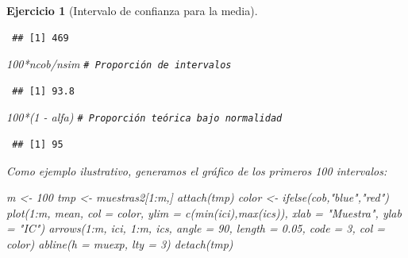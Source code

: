 \documentclass[
  10pt,
]{book}
\newenvironment{Shaded}{\begin{snugshade}}{\end{snugshade}}
\newcommand{\AttributeTok}[1]{\textcolor[rgb]{0.77,0.63,0.00}{#1}}
\newcommand{\CommentTok}[1]{\textcolor[rgb]{0.56,0.35,0.01}{\textit{#1}}}
\newcommand{\DecValTok}[1]{\textcolor[rgb]{0.00,0.00,0.81}{#1}}
\newcommand{\FloatTok}[1]{\textcolor[rgb]{0.00,0.00,0.81}{#1}}
\newcommand{\FunctionTok}[1]{\textcolor[rgb]{0.00,0.00,0.00}{#1}}
\newcommand{\NormalTok}[1]{#1}
\newcommand{\OtherTok}[1]{\textcolor[rgb]{0.56,0.35,0.01}{#1}}
\newcommand{\SpecialCharTok}[1]{\textcolor[rgb]{0.00,0.00,0.00}{#1}}
\newcommand{\StringTok}[1]{\textcolor[rgb]{0.31,0.60,0.02}{#1}}
\theoremstyle{break}
\newtheorem{exercise}{Ejercicio}[chapter]
\theoremstyle{nonumberplain}
\renewcommand{\CommentTok}[1]{\textcolor[rgb]{0.41,0.41,0.41}{\texttt{#1}}}
\begin{document}
\begin{exercise}[Intervalo de confianza para la media]
\begin{enumerate}
\begin{verbatim}
 ## [1] 469
\end{verbatim}

\begin{Shaded}
\begin{Highlighting}[]
\DecValTok{100}\SpecialCharTok{*}\NormalTok{ncob}\SpecialCharTok{/}\NormalTok{nsim     }\CommentTok{\# Proporción de intervalos}
\end{Highlighting}
\end{Shaded}

\begin{verbatim}
 ## [1] 93.8
\end{verbatim}

\begin{Shaded}
\begin{Highlighting}[]
\DecValTok{100}\SpecialCharTok{*}\NormalTok{(}\DecValTok{1} \SpecialCharTok{{-}}\NormalTok{ alfa)    }\CommentTok{\# Proporción teórica bajo normalidad}
\end{Highlighting}
\end{Shaded}

\begin{verbatim}
 ## [1] 95
\end{verbatim}

  Como ejemplo ilustrativo, generamos el gráfico de los primeros 100 intervalos:

\begin{Shaded}
\begin{Highlighting}[]
\NormalTok{m }\OtherTok{\textless{}{-}} \DecValTok{100}
\NormalTok{tmp }\OtherTok{\textless{}{-}}\NormalTok{ muestras2[}\DecValTok{1}\SpecialCharTok{:}\NormalTok{m,]}
\FunctionTok{attach}\NormalTok{(tmp)}
\NormalTok{color }\OtherTok{\textless{}{-}} \FunctionTok{ifelse}\NormalTok{(cob,}\StringTok{"blue"}\NormalTok{,}\StringTok{"red"}\NormalTok{)}
\FunctionTok{plot}\NormalTok{(}\DecValTok{1}\SpecialCharTok{:}\NormalTok{m, mean, }\AttributeTok{col =}\NormalTok{ color, }\AttributeTok{ylim =} \FunctionTok{c}\NormalTok{(}\FunctionTok{min}\NormalTok{(ici),}\FunctionTok{max}\NormalTok{(ics)), }
     \AttributeTok{xlab =} \StringTok{"Muestra"}\NormalTok{, }\AttributeTok{ylab =} \StringTok{"IC"}\NormalTok{)}
\FunctionTok{arrows}\NormalTok{(}\DecValTok{1}\SpecialCharTok{:}\NormalTok{m, ici, }\DecValTok{1}\SpecialCharTok{:}\NormalTok{m, ics, }\AttributeTok{angle =} \DecValTok{90}\NormalTok{, }\AttributeTok{length =} \FloatTok{0.05}\NormalTok{, }\AttributeTok{code =} \DecValTok{3}\NormalTok{, }\AttributeTok{col =}\NormalTok{ color)}
\FunctionTok{abline}\NormalTok{(}\AttributeTok{h =}\NormalTok{ muexp, }\AttributeTok{lty =} \DecValTok{3}\NormalTok{)}
\FunctionTok{detach}\NormalTok{(tmp)}
\end{Highlighting}
\end{Shaded}


\end{enumerate}
\end{exercise}
\end{document}

